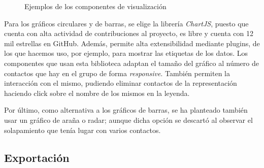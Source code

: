 \begin{figure}[h]
	
	\qquad
	\caption{Ejemplos de los componentes de visualización}
	\label{fig:chap4:visualization_examples}
\end{figure}

Para los gráficos circulares y de barras, se elige la librería \textit{ChartJS}, puesto que cuenta con alta actividad de contribuciones al proyecto, es libre y cuenta con 12 mil estrellas en GitHub. Además, permite alta extensibilidad mediante plugins, de los que hacemos uso, por ejemplo, para mostrar las etiquetas de los datos. Los componentes que usan esta biblioteca adaptan el tamaño del gráfico al número de contactos que hay en el grupo de forma \textit{responsive}. También permiten la interacción con el mismo, pudiendo eliminar contactos de la representación haciendo click sobre el nombre de los mismos en la leyenda.

Por último, como alternativa a los gráficos de barras, se ha planteado también usar un gráfico de araña o radar; aunque dicha opción se descartó al observar el solapamiento que tenía lugar con varios contactos.


\subsection{Exportación}

